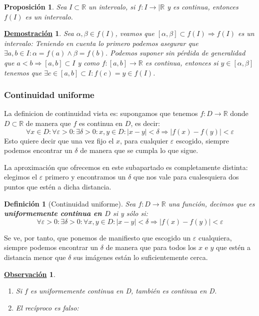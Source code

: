 \documentclass[10pt,a4paper,openright]{book}
\theoremstyle{break}
\newtheorem{defi}{Definición}[chapter]
\newtheorem{prop}{Proposición}[chapter]
\newtheorem*{demo}{\underline{Demostración}}
\newtheorem{obs}{\underline{Observación}}[chapter]
\begin{document}
\begin{prop}
Sea $I\subset \mathbb R$ un intervalo, si $f: I\rightarrow |\mathbb R$ y es continua, entonces $f(I)$ es un intervalo.
\end{prop}
\begin{demo}
Sea $\alpha, \beta\in f(I)$, veamos que $[\alpha, \beta]\subset f(I)\Rightarrow f(I)$ es un intervalo:
Teniendo en cuenta lo primero podemos asegurar que $\exists a, b \in I: \alpha=f(a) \wedge \beta=f(b)$. Podemos suponer sin pérdida de generalidad que $a<b\Rightarrow [a,b]\subset I$ y como $f:[a,b]\rightarrow \mathbb R$ es continua, entonces si $y \in [\alpha,\beta]$ tenemos que $\exists c\in [a,b]\subset I: f(c)=y\in f(I)$.
\end{demo}

\subsubsection{Continuidad uniforme}
La definicion de continuidad vista es: supongamos que tenemos $f: D\rightarrow \mathbb R$ donde $D\subset \mathbb R$ de manera que $f$ es continua en $D$, es decir:
$$\forall x\in D: \forall \varepsilon>0: \exists \delta>0 : x,y \in D: |x-y|<\delta\Rightarrow |f(x)-f(y)|<\varepsilon$$
Esto quiere decir que una vez fijo el $x$, para cualquier $\varepsilon$ escogido, siempre podemos encontrar un $\delta$ de manera que se cumpla lo que sigue.

La aproximación que ofrecemos en este subapartado es completamente distinta: elegimos el $\varepsilon$ primero y encontramos un $\delta$ que nos vale para cualesquiera dos puntos que estén a dicha distancia.

\begin{defi}[Continuidad uniforme]
Sea $f:D\rightarrow \mathbb{R}$ una función, decimos que es \textbf{uniformemente continua en $D$} si y sólo si:
$$\forall \varepsilon>0: \exists \delta>0 : \forall x, y \in D: |x-y|<\delta \Rightarrow |f(x)-f(y)|<\varepsilon$$
\end{defi}

Se ve, por tanto, que ponemos de manifiesto que escogido un $\varepsilon$ cualquiera, siempre podemos encontrar un $\delta$ de manera que para todos los $x$ e $y$ que estén a distancia menor que $\delta$ sus imágenes están lo suficientemente cerca.

\begin{obs}
\begin{enumerate}
\item Si $f$ es uniformemente continua en D, también es continua en D.

\item  El recíproco es falso:
\end{enumerate}
\end{obs}
\end{document}
